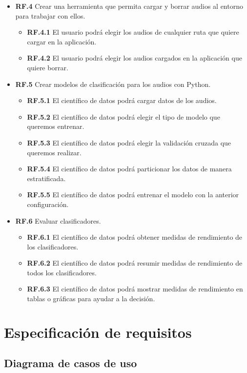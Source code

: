 \begin{itemize}
	\item \textbf{RF.4} Crear una herramienta que permita cargar y borrar audios al entorno para trabajar con ellos.
	\begin{itemize}
	\item \textbf{RF.4.1} El usuario podrá elegir los audios de cualquier ruta que quiere cargar en la aplicación.
	\item \textbf{RF.4.2} El usuario podrá elegir los audios cargados en la aplicación que quiere borrar.
	\end{itemize}
	
	\item \textbf{RF.5} Crear modelos de clasificación para los audios con Python.
	\begin{itemize}
	\item \textbf{RF.5.1} El científico de datos podrá cargar datos de los audios.
	\item \textbf{RF.5.2} El científico de datos podrá elegir el tipo de modelo que queremos entrenar.
	\item \textbf{RF.5.3} El científico de datos podrá elegir la validación cruzada que queremos realizar.
	\item \textbf{RF.5.4} El científico de datos podrá particionar los datos de manera estratificada.
	\item \textbf{RF.5.5} El científico de datos podrá entrenar el modelo con la anterior configuración.
	\end{itemize}
	
	\item \textbf{RF.6} Evaluar clasificadores.
	\begin{itemize}
	\item \textbf{RF.6.1} El científico de datos podrá obtener medidas de rendimiento de los clasificadores.
	\item \textbf{RF.6.2} El científico de datos podrá resumir medidas de rendimiento de todos los clasificadores.
	\item \textbf{RF.6.3} El científico de datos podrá mostrar medidas de rendimiento en tablas o gráficas para ayudar a la decisión.
	\end{itemize}
\end{itemize}

\section{Especificación de requisitos}
\subsection{Diagrama de casos de uso}

